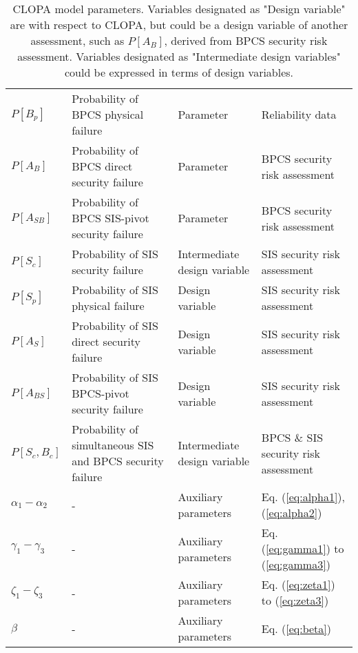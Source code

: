 \documentclass[journal]{IEEEtran}
\begin{document}
\begin{table*}[]
\begin{tabular}{p{1.5cm} p{6cm} p{3.5cm} p{4cm}}
	$P[B_p]$    &  Probability of BPCS physical failure & Parameter & Reliability data  \\
	$P[A_B]$    & Probability of BPCS direct security failure & Parameter & BPCS security risk assessment  \\
	$P[A_{SB}]$    &  Probability of BPCS SIS-pivot security failure & Parameter & BPCS security risk assessment \\
	$P[S_c]$    &  Probability of SIS security failure & Intermediate design variable & SIS security risk assessment \\
	$P[S_p]$    &  Probability of SIS physical failure & Design variable  & SIS security risk assessment \\
	$P[A_S]$    & Probability of SIS direct security failure & Design variable & SIS security risk assessment \\
	$P[A_{BS}]$    &  Probability of SIS BPCS-pivot security failure & Design variable & SIS security risk assessment  \\
	$P[S_c,B_c]$ & Probability of simultaneous SIS and BPCS security failure & Intermediate design variable & BPCS \& SIS security risk assessment \\ 
	$\alpha_1 - \alpha_2$ & - & Auxiliary parameters & Eq. (\ref{eq:alpha1}), (\ref{eq:alpha2})  \\
	$\gamma_1 - \gamma_3$ & - & Auxiliary parameters  & Eq. (\ref{eq:gamma1}) to (\ref{eq:gamma3}) \\ 
	$\zeta_1 - \zeta_3$ & - & Auxiliary parameters  & Eq. (\ref{eq:zeta1}) to (\ref{eq:zeta3}) \\ 
	$\beta$ & - & Auxiliary parameters & Eq. (\ref{eq:beta})  \\
	\hline
\end{tabular}
\caption{CLOPA model parameters. Variables designated as "Design variable" are with respect to CLOPA, but could be a design variable of another assessment, such as $P[A_B]$, derived from BPCS security risk assessment. Variables designated as "Intermediate design variables" could be expressed in terms of design variables.}
\label{tab:Model-Parameters}
\end{table*}


%
%


\flushend
% 
\end{document}

